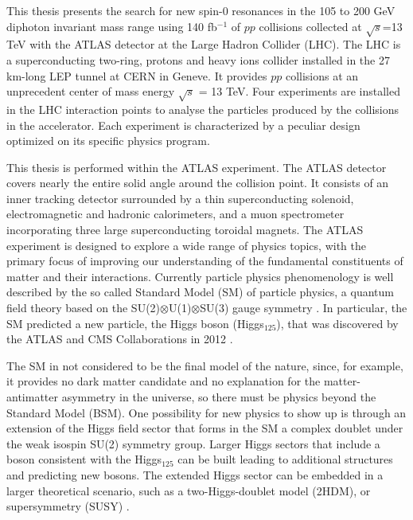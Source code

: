 \documentclass[a4paper, oneside, 11pt]{book}
\begin{document}
	This thesis presents the search for new spin-0 resonances in the 105 to 200 GeV diphoton invariant mass range using 140 fb$^{-1}$ of $pp$ collisions collected at $\sqrt{s}$=13 TeV with the ATLAS detector at the Large Hadron Collider (LHC). The LHC \cite{LHC_DESIGN_2004,LHC_DESIGN_2008} is a superconducting two-ring, protons and heavy ions collider installed in the 27 km-long LEP \cite{LEP_DESIGN_2001} tunnel at CERN in Geneve. It provides $pp$ collisions at an unprecedent center of mass energy $\sqrt{s}$ = 13 TeV. Four experiments are installed in the LHC interaction points to analyse the particles produced by the collisions in the accelerator. Each experiment is characterized by a peculiar design optimized on its specific physics program.
	
	This thesis is performed within the ATLAS \cite{ATLAS_DESIGN_2008} experiment. The ATLAS detector covers nearly the entire solid angle around the collision point. It consists of an inner tracking detector surrounded by a thin superconducting solenoid, electromagnetic and hadronic calorimeters, and a muon spectrometer incorporating three large superconducting toroidal magnets. The ATLAS experiment is designed to explore a wide range of physics topics, with the primary focus of improving our understanding of the fundamental constituents of matter and their interactions. Currently particle physics phenomenology is well described by the so called Standard Model (SM) of particle physics, a quantum field theory based on the SU(2)$\otimes$U(1)$\otimes$SU(3) gauge symmetry \cite{weinberg_1995}. In particular, the SM predicted a new particle, the Higgs boson (Higgs$_{125}$), that was discovered by the ATLAS and CMS Collaborations in 2012 \cite{higgs_atlas,higgs_cms}.
	
	The SM in not considered to be the final model of the nature, since, for example, it provides no dark matter candidate and no explanation for the matter-antimatter asymmetry in the universe, so there must be physics beyond the Standard Model (BSM). One possibility for new physics to show up is through an extension of the Higgs field sector that forms in the SM a complex doublet under the weak isospin SU(2) symmetry group. Larger Higgs sectors that include a boson consistent with the Higgs$_{125}$ can be built leading to additional structures and predicting new bosons. The extended Higgs sector can be embedded in a larger theoretical scenario, such as a two-Higgs-doublet model (2HDM)\cite{Branco_2012}, or supersymmetry (SUSY) \cite{dine_2016}.
	
\end{document}
